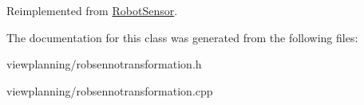 Reimplemented from \hyperlink{classRobotSensor_a76298deca29d80b6543f628f10060bec}{Robot\+Sensor}.



The documentation for this class was generated from the following files\+:\begin{DoxyCompactItemize}
\item 
viewplanning/robsennotransformation.\+h\item 
viewplanning/robsennotransformation.\+cpp\end{DoxyCompactItemize}
